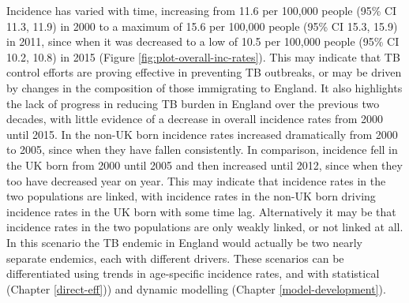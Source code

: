 \documentclass[11pt,twoside]{bristolthesis}
\begin{document}
  Incidence has varied with time, increasing from 11.6 per 100,000 people (95\% CI 11.3, 11.9) in 2000 to a maximum of 15.6 per 100,000 people (95\% CI 15.3, 15.9) in 2011, since when it was decreased to a low of 10.5 per 100,000 people (95\% CI 10.2, 10.8) in 2015 (Figure \ref{fig:plot-overall-inc-rates}). This may indicate that TB control efforts are proving effective in preventing TB outbreaks, or may be driven by changes in the composition of those immigrating to England. It also highlights the lack of progress in reducing TB burden in England over the previous two decades, with little evidence of a decrease in overall incidence rates from 2000 until 2015. In the non-UK born incidence rates increased dramatically from 2000 to 2005, since when they have fallen consistently. In comparison, incidence fell in the UK born from 2000 until 2005 and then increased until 2012, since when they too have decreased year on year. This may indicate that incidence rates in the two populations are linked, with incidence rates in the non-UK born driving incidence rates in the UK born with some time lag. Alternatively it may be that incidence rates in the two populations are only weakly linked, or not linked at all. In this scenario the TB endemic in England would actually be two nearly separate endemics, each with different drivers. These scenarios can be differentiated using trends in age-specific incidence rates, and with statistical (Chapter \ref{direct-eff})) and dynamic modelling (Chapter \ref{model-development}).
\end{document}
